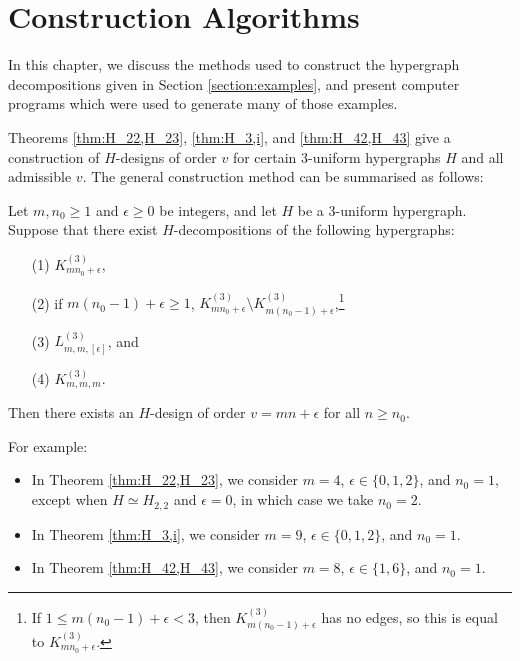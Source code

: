 \section{Construction Algorithms}

In this chapter, we discuss the methods used to construct the hypergraph decompositions given in Section \ref{section:examples}, and present computer programs which were used to generate many of those examples.

Theorems \ref{thm:H_22,H_23}, \ref{thm:H_3,i}, and \ref{thm:H_42,H_43} give a construction of $H$-designs of order $v$ for certain $3$-uniform hypergraphs $H$ and all admissible $v$.
The general construction method can be summarised as follows:

\begin{theorem} \label{thm:design-method}
Let $m, n_0 \geq 1$ and $\epsilon \geq 0$ be integers, and let $H$ be a $3$-uniform hypergraph.
Suppose that there exist $H$-decompositions of the following hypergraphs:
\begin{enumerate}
    \item[(1)] $K_{mn_0 + \epsilon}^{(3)}$,
    \item[(2)] if $m(n_0-1)+\epsilon \geq 1$, $K_{mn_0+\epsilon}^{(3)} \setminus K_{m(n_0-1)+\epsilon}^{(3)}$,\footnote{If $1 \leq m(n_0-1)+\epsilon < 3$, then $K_{m(n_0-1)+\epsilon}^{(3)}$ has no edges, so this is equal to $K_{mn_0 + \epsilon}^{(3)}$.}
    \item[(3)] $L_{m,m,[\epsilon]}^{(3)}$, and
    \item[(4)] $K_{m,m,m}^{(3)}$.
\end{enumerate}
Then there exists an $H$-design of order $v = mn + \epsilon$ for all $n \geq n_0$.
\end{theorem}

For example:
\begin{itemize}
     \item In Theorem \ref{thm:H_22,H_23}, we consider $m = 4$, $\epsilon \in \{0,1,2\}$, and $n_0 = 1$, except when $H \simeq H_{2,2}$ and $\epsilon = 0$, in which case we take $n_0 = 2$.
     \item In Theorem \ref{thm:H_3,i}, we consider $m = 9$, $\epsilon \in \{0,1,2\}$, and $n_0 = 1$.
     \item In Theorem \ref{thm:H_42,H_43}, we consider $m = 8$, $\epsilon \in \{1,6\}$, and $n_0 = 1$.
 \end{itemize}

